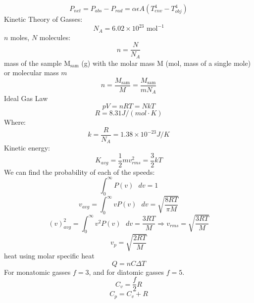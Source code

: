 \documentclass[11pt]{article}
\begin{document}
    \begin{equation}
    P_{net} = P_{abs} - P_{rad} = \alpha \epsilon A (T_{env}^4 - T_{obj}^4) \tag{net power}
    \end{equation}
    Kinetic Theory of Gasses:
    \begin{equation}
        N_A = 6.02 \times 10^{23} \text{ mol}^{-1} \tag{Avogadro's number}
    \end{equation}
    $n$ moles, $N$ molecules:
    \begin{equation}
        n = \frac{N}{N_A} \tag{moles}
    \end{equation}
    \noindent mass of the sample M$_{\text{sam}}$ (g)
    with the molar mass M (mol, mass of a single mole) or molecular mass $m$
    \begin{equation}
        n = \frac{M_{\text{sam}}}{M} = \frac{M_{\text{sam}}}{mN_A} \tag{moles}
    \end{equation}
    Ideal Gas Law
    \begin{equation}
        pV = nRT = NkT \tag{Ideal Gas Law}
    \end{equation}
    \begin{equation}
        R = 8.31 J/(mol \cdot K) \tag{ideal gas constant}
    \end{equation}
    Where:
    \begin{equation}
        k = \frac{R}{N_A} = 1.38 \times 10^{-23} J/K \tag{Boltzmann constant}
    \end{equation}
    Kinetic energy:
    \begin{equation}
        K_{avg} = \frac{1}{2}mv_{rms}^2 = \frac{3}{2} kT \tag{average kinetic energy}
    \end{equation}
    We can find the probability of each of the speeds:
    \begin{equation}
        \int_{0}^{\infty} P(v) \text{ } dv = 1
    \end{equation}
    \begin{equation}
        v_{avg} = \int_{0}^{\infty} v P(v) \text{ } dv = \sqrt{\frac{8RT}{\pi M}}
    \end{equation}
    \begin{equation}
    (v)^2_{avg} = \int_{0}^{\infty} v^2 P(v) \text{ } dv = \frac{3RT}{ M} \Rightarrow v_{rms} = \sqrt{\frac{3RT}{M}}
    \end{equation}
    \begin{equation}
        v_p = \sqrt{\frac{2RT}{M}} \tag{most probable, P(v) peak}
    \end{equation}
    heat using molar specific heat
    \begin{equation}
        Q = nC \Delta T
    \end{equation}
    For monatomic gasses $f = 3$, and for diatomic gasses $f = 5$.
    \begin{equation}
        C_v = \frac{f}{2} R
    \end{equation}
    \begin{equation}
        C_p = C_v + R
    \end{equation}
\end{document}
